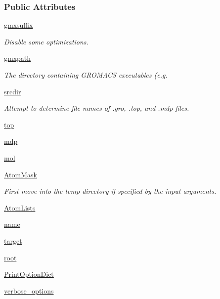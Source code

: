 \subsubsection*{\-Public \-Attributes}
\begin{DoxyCompactItemize}
\item 
\hyperlink{classforcebalance_1_1gmxio_1_1GMX_aa4a785e2fe56ab52dc7ba697f11ade38}{gmxsuffix}
\begin{DoxyCompactList}\small\item\em \-Disable some optimizations. \end{DoxyCompactList}\item 
\hyperlink{classforcebalance_1_1gmxio_1_1GMX_ac95b0bbbf2116fe2a568a5fffeec8dfb}{gmxpath}
\begin{DoxyCompactList}\small\item\em \-The directory containing \-G\-R\-O\-M\-A\-C\-S executables (e.\-g. \end{DoxyCompactList}\item 
\hyperlink{classforcebalance_1_1gmxio_1_1GMX_a807d5d8c04c41e1c4fdd9a68487efc80}{srcdir}
\begin{DoxyCompactList}\small\item\em \-Attempt to determine file names of .gro, .top, and .mdp files. \end{DoxyCompactList}\item 
\hyperlink{classforcebalance_1_1gmxio_1_1GMX_a028f08b3c967c49c38855b75bb5ea629}{top}
\item 
\hyperlink{classforcebalance_1_1gmxio_1_1GMX_aff0a58dbc932d5721c034b6d94f0572f}{mdp}
\item 
\hyperlink{classforcebalance_1_1gmxio_1_1GMX_a8aa31cbeac385856edf0cbeeeae59138}{mol}
\item 
\hyperlink{classforcebalance_1_1gmxio_1_1GMX_ab64c929dcf94ae0675174995c7014cb7}{\-Atom\-Mask}
\begin{DoxyCompactList}\small\item\em \-First move into the temp directory if specified by the input arguments. \end{DoxyCompactList}\item 
\hyperlink{classforcebalance_1_1gmxio_1_1GMX_a19372f8fcd41247cba35691d5a68695d}{\-Atom\-Lists}
\item 
\hyperlink{classforcebalance_1_1engine_1_1Engine_ac8043b1c763d4a3ccc1a29ec99f4cd26}{name}
\item 
\hyperlink{classforcebalance_1_1engine_1_1Engine_a5e2383d62ef4df388a04c1c8b8409cab}{target}
\item 
\hyperlink{classforcebalance_1_1engine_1_1Engine_a7be99908e51fe6d616a665bf2ad70b1c}{root}
\item 
\hyperlink{classforcebalance_1_1BaseClass_afc6659278497d7245bc492ecf405ccae}{\-Print\-Option\-Dict}
\item 
\hyperlink{classforcebalance_1_1BaseClass_afd68efa29ccd2f320f4cf82198214aac}{verbose\-\_\-options}
\end{DoxyCompactItemize}



